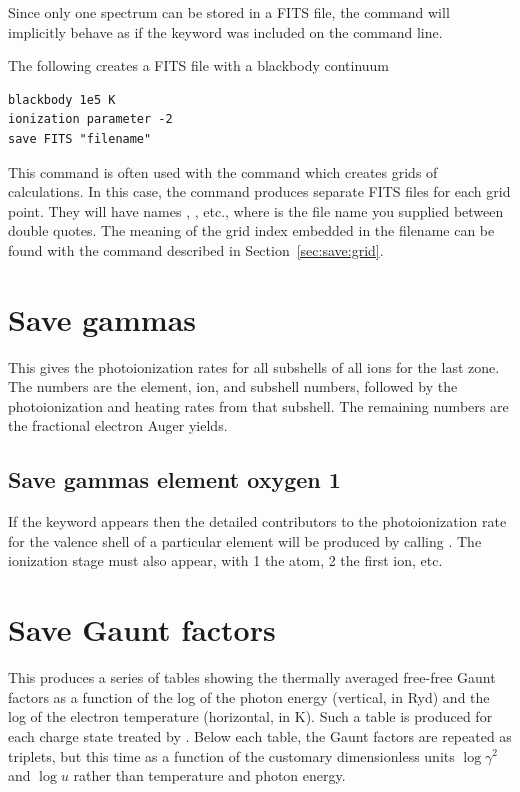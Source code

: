 Since only one spectrum can be stored in a FITS file, the command will
implicitly behave as if the keyword  was included on the
command line.

The following creates a FITS file with a blackbody continuum
\begin{verbatim}
blackbody 1e5 K
ionization parameter -2
save FITS "filename"
\end{verbatim}

This command is often used with the  command which creates
grids of calculations. In this case, the command produces separate FITS files
for each grid point. They will have names
, ,
etc., where  is the file name you supplied between double
quotes. The meaning of the grid index embedded in the filename can be found with
the  command described in Section~\ref{sec:save:grid}.

\section{Save gammas}

This gives the photoionization rates for all subshells of all ions for
the last zone.  The numbers are the element, ion, and subshell numbers,
followed by the photoionization and heating rates from that subshell.  The
remaining numbers are the fractional electron Auger yields.

\subsection{Save gammas element oxygen 1}

If the  keyword appears then the detailed contributors to the
photoionization rate for the valence shell of a particular element will
be produced by calling .
The ionization stage must also appear,
with 1 the atom, 2 the first ion, etc.

\section{Save Gaunt factors}

This produces a series of tables showing the thermally averaged free-free
Gaunt factors as a function of the log of the photon energy (vertical, in Ryd)
and the log of the electron temperature (horizontal, in K). Such a table is
produced for each charge state treated by \Cloudy. Below each table, the Gaunt
factors are repeated as triplets, but this time as a function of the customary
dimensionless units $\log \gamma^2$ and $\log u$ rather than temperature and
photon energy.

